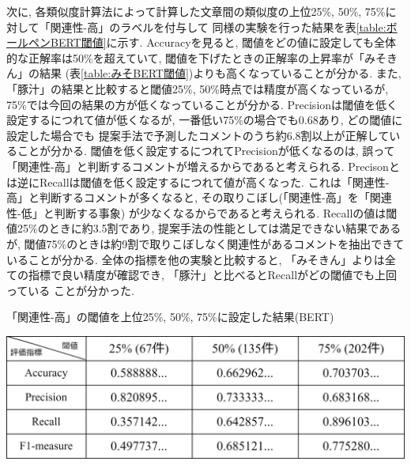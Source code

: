 \documentclass{ltjarticle}
\begin{document}
次に, 各類似度計算法によって計算した文章間の類似度の上位25\%, 50\%, 75\%に対して「関連性-高」のラベルを付与して
同様の実験を行った結果を表\ref{table:ボールペンBERT閾値}に示す. 
Accuracyを見ると, 閾値をどの値に設定しても全体的な正解率は50\%を超えていて, 閾値を下げたときの正解率の上昇率が「みそきん」の結果
(表\ref{table:みそBERT閾値})よりも高くなっていることが分かる. 
\newpage
\noindent また, 「豚汁」の結果と比較すると閾値25\%, 50\%時点では精度が高くなっているが, 75\%では今回の結果の方が低くなっていることが分かる. 
Precisionは閾値を低く設定するにつれて値が低くなるが, 一番低い75\%の場合でも0.68あり, どの閾値に設定した場合でも
提案手法で予測したコメントのうち約6.8割以上が正解していることが分かる. 
閾値を低く設定するにつれてPrecisionが低くなるのは, 誤って「関連性-高」と判断するコメントが増えるからであると考えられる. 
Precisonとは逆にRecallは閾値を低く設定するにつれて値が高くなった. 
これは「関連性-高」と判断するコメントが多くなると, その取りこぼし(「関連性-高」を「関連性-低」と判断する事象)
が少なくなるからであると考えられる. 
Recallの値は閾値25\%のときに約3.5割であり, 提案手法の性能としては満足できない結果であるが, 
閾値75\%のときは約9割で取りこぼしなく関連性があるコメントを抽出できていることが分かる. 
全体の指標を他の実験と比較すると, 「みそきん」よりは全ての指標で良い精度が確認でき, 「豚汁」と比べるとRecallがどの閾値でも上回っている
ことが分かった. 
\begin{table}[ht]
    \centering
    \caption{「関連性-高」の閾値を上位25\%, 50\%, 75\%に設定した結果(BERT)}
    \vspace{5truept}

    \includegraphics[width = 13.5cm]{images/ボールペンimages/BERT閾値.drawio.png}
    \label{table:ボールペンBERT閾値}
\end{table}
\vspace{10truept}
\end{document}
